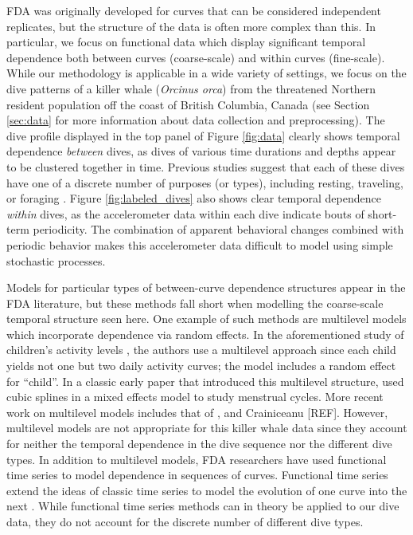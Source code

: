 FDA was originally developed for curves that can be considered independent replicates, but the structure of the data is often more complex than this. In particular, we focus on functional data which display significant temporal dependence both between curves (coarse-scale) and within curves (fine-scale). While our methodology is applicable in a wide variety of settings, we focus on the dive patterns of a killer whale (\textit{Orcinus orca}) from the threatened Northern resident population off the coast of British Columbia, Canada (see Section \ref{sec:data} for more information about data collection and preprocessing). 
The dive profile displayed in the top panel of Figure \ref{fig:data} clearly shows temporal dependence \textit{between} dives, as dives of various time durations and depths appear to be clustered together in time. Previous studies suggest that each of these dives have one of a discrete number of purposes (or types), including resting, traveling, or foraging \citep{Tennessen:2019b}.
Figure {\ref{fig:labeled_dives}} also shows clear temporal dependence \textit{within} dives, as the accelerometer data within each dive indicate bouts of short-term periodicity. The combination of apparent behavioral changes combined with periodic behavior makes this accelerometer data difficult to model using simple stochastic processes.

Models for particular types of between-curve dependence structures appear in the FDA literature, but these methods fall short when modelling the coarse-scale temporal structure seen here. One example of such methods are multilevel models which incorporate dependence via random effects. In the aforementioned study of children's activity levels \citep{Morris:2007}, the authors use a multilevel approach since each child yields not one but two daily activity curves; the model includes a random effect for ``child''. In a classic early paper that introduced this multilevel structure,  \cite{Bromback:1998} used cubic splines in a mixed effects model to study menstrual cycles. More recent work on multilevel models includes that of \cite{di:2009}, \cite{chen:2012} and Crainiceanu [REF]. However, multilevel models are not appropriate for this killer whale data since they account for neither the temporal dependence in the dive sequence nor the different dive types. 
In addition to multilevel models, FDA researchers have used functional time series to model dependence in sequences of curves. Functional time series extend the ideas of classic time series to model the evolution of one curve into the next \citep{Kokoszka:2018}. While functional time series methods can in theory be applied to our dive data, they do not account for the discrete number of different dive types.
 

